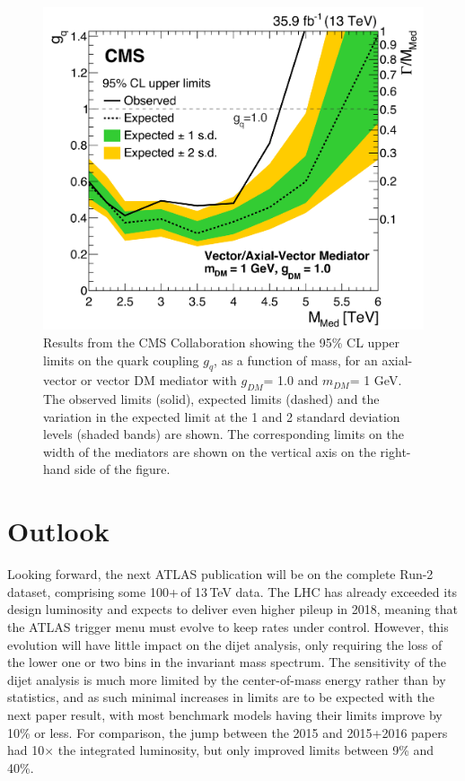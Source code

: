 \begin{figure}[]
	\centering
	\includegraphics[width=\columnwidth]{figures/Conclusion/CMSZPrime.png}
	\caption{Results from the CMS Collaboration showing the 95\% CL upper limits on the quark coupling $g_q$, as a function of mass, for an axial-vector or vector DM mediator with $g_{DM}$= 1.0 and $m_{DM}$= 1 GeV. The observed limits (solid), expected limits (dashed) and the variation in the expected limit at the 1 and 2 standard deviation levels (shaded bands) are shown. The corresponding limits on the width of the mediators are shown on the vertical axis on the right-hand side of the figure.\cite{CMSAngular}}
	\label{fig:CMSZPrime}
\end{figure}

\section{Outlook}
Looking forward, the next ATLAS publication will be on the complete Run-2 dataset, comprising some 100+\,\ifb of 13\,TeV data.  The LHC has already exceeded its design luminosity and expects to deliver even higher pileup in 2018, meaning that the ATLAS trigger menu must evolve to keep rates under control.  However, this evolution will have little impact on the dijet analysis, only requiring the loss of the lower one or two bins in the invariant mass spectrum.  The sensitivity of the dijet analysis is much more limited by the center-of-mass energy rather than by statistics, and as such minimal increases in limits are to be expected with the next paper result, with most benchmark models having their limits improve by 10\% or less. For comparison, the jump between the 2015 and 2015+2016 papers had 10$\times$ the integrated luminosity, but only improved limits between 9\% and 40\%.

